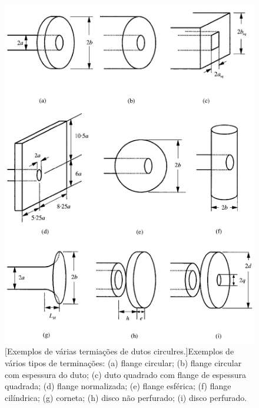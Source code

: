 \begin{figure}[ht!]
\centering
  \includegraphics[width=.8\linewidth]{figuras/diferentes_dutos.png}
  \\
  [Exemplos de várias termiações de dutos circulres.]{Exemplos de vários tipos de terminações: (a) flange circular; (b) flange circular com espessura do duto; (c) duto quadrado com flange de espessura quadrada; (d) flange normalizada; (e) flange esférica; (f) flange cilíndrica; (g) corneta; (h) disco não perfurado; (i) disco perfurado.}
  \label{fig:diferentes_dutos}
\end{figure}